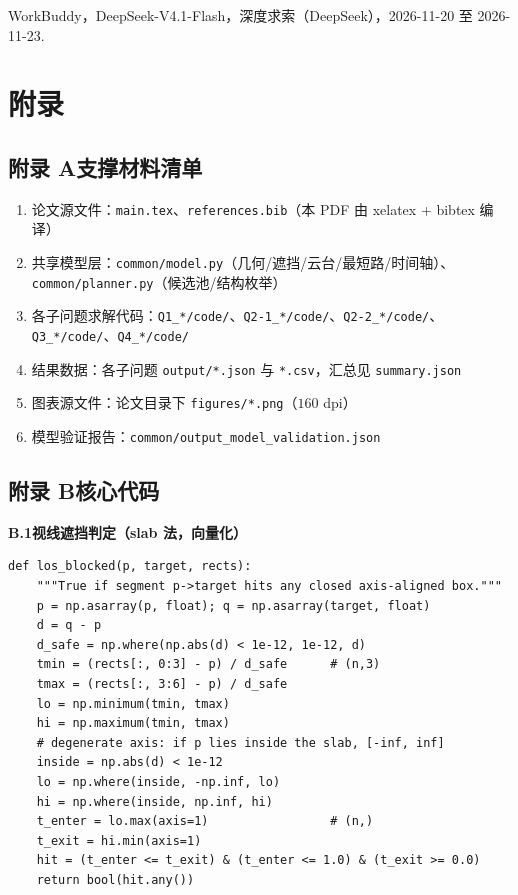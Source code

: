 \documentclass[UTF8,a4paper,zihao=-4,oneside]{ctexart}
\begin{document}
\noindent [13] WorkBuddy，DeepSeek-V4.1-Flash，深度求索（DeepSeek），2026-11-20 至 2026-11-23.
\newpage
\section*{附录}

\subsection*{附录 A\quad 支撑材料清单}
\sloppy
\begin{enumerate}[leftmargin=2em]
  \item 论文源文件：\texttt{main.tex}、\texttt{references.bib}（本 PDF 由 xelatex + bibtex 编译）
  \item 共享模型层：\texttt{common/model.py}（几何/遮挡/云台/最短路/时间轴）、\texttt{common/planner.py}（候选池/结构枚举）
  \item 各子问题求解代码：\texttt{Q1\_*/code/}、\texttt{Q2-1\_*/code/}、\texttt{Q2-2\_*/code/}、\texttt{Q3\_*/code/}、\texttt{Q4\_*/code/}
  \item 结果数据：各子问题 \texttt{output/*.json} 与 \texttt{*.csv}，汇总见 \texttt{summary.json}
  \item 图表源文件：论文目录下 \texttt{figures/*.png}（$160$ dpi）
  \item 模型验证报告：\texttt{common/output\_model\_validation.json}
\end{enumerate}

\subsection*{附录 B\quad 核心代码}

\noindent\textbf{B.1\quad 视线遮挡判定（slab 法，向量化）}
\begin{lstlisting}
def los_blocked(p, target, rects):
    """True if segment p->target hits any closed axis-aligned box."""
    p = np.asarray(p, float); q = np.asarray(target, float)
    d = q - p
    d_safe = np.where(np.abs(d) < 1e-12, 1e-12, d)
    tmin = (rects[:, 0:3] - p) / d_safe      # (n,3)
    tmax = (rects[:, 3:6] - p) / d_safe
    lo = np.minimum(tmin, tmax)
    hi = np.maximum(tmin, tmax)
    # degenerate axis: if p lies inside the slab, [-inf, inf]
    inside = np.abs(d) < 1e-12
    lo = np.where(inside, -np.inf, lo)
    hi = np.where(inside, np.inf, hi)
    t_enter = lo.max(axis=1)                 # (n,)
    t_exit = hi.min(axis=1)
    hit = (t_enter <= t_exit) & (t_enter <= 1.0) & (t_exit >= 0.0)
    return bool(hit.any())
\end{lstlisting}
\end{document}
